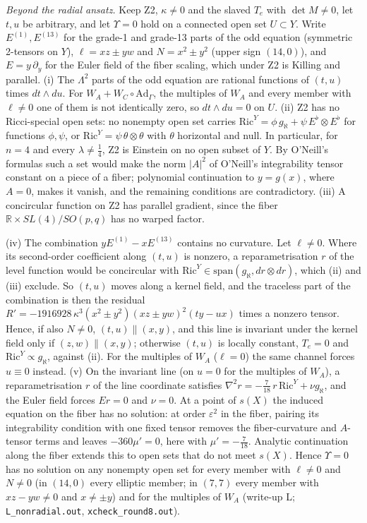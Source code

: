 \documentclass[11pt]{article}
\theoremstyle{remark}
\begin{document}
\emph{Beyond the radial ansatz.} Keep Z2, $\kappa\neq0$ and the slaved $T_e$ with $\det M\neq0$, let $t,u$ be arbitrary, and let $\Upsilon=0$ hold on a connected open set $U\subset Y$. Write $E^{(1)},E^{(13)}$ for the grade-1 and grade-13 parts of the odd equation (symmetric 2-tensors on $Y$), $\ell=xz\pm yw$ and $N=x^2\pm y^2$ (upper sign $(14,0)$), and $E=y\,\partial_y$ for the Euler field of the fiber scaling, which under Z2 is Killing and parallel. (i) The $\Lambda^2$ parts of the odd equation are rational functions of $(t,u)$ times $dt\wedge du$. For $W_A+W_C\circ\mathrm{Ad}_\Gamma$, the multiples of $W_A$ and every member with $\ell\neq0$ one of them is not identically zero, so $dt\wedge du=0$ on $U$. (ii) Z2 has no Ricci-special open sets: no nonempty open set carries $\mathrm{Ric}^Y=\phi\,g_\aleph+\psi\,E^\flat\otimes E^\flat$ for functions $\phi,\psi$, or $\mathrm{Ric}^Y=\psi\,\theta\otimes\theta$ with $\theta$ horizontal and null. In particular, for $n=4$ and every $\lambda\neq\tfrac14$, Z2 is Einstein on no open subset of $Y$. By O'Neill's formulas such a set would make the norm $|A|^2$ of O'Neill's integrability tensor constant on a piece of a fiber; polynomial continuation to $y=g(x)$, where $A=0$, makes it vanish, and the remaining conditions are contradictory. (iii) A concircular function on Z2 has parallel gradient, since the fiber $\mathbb R\times SL(4)/SO(p,q)$ has no warped factor.

(iv) The combination $yE^{(1)}-xE^{(13)}$ contains no curvature. Let $\ell\neq0$. Where its second-order coefficient along $(t,u)$ is nonzero, a reparametrisation $r$ of the level function would be concircular with $\mathrm{Ric}^Y\in\mathrm{span}(g_\aleph,dr\otimes dr)$, which (ii) and (iii) exclude. So $(t,u)$ moves along a kernel field, and the traceless part of the combination is then the residual $R'=-1916928\,\kappa^3(x^2\pm y^2)(xz\pm yw)^2(ty-ux)$ times a nonzero tensor. Hence, if also $N\neq0$, $(t,u)\parallel(x,y)$, and this line is invariant under the kernel field only if $(z,w)\parallel(x,y)$; otherwise $(t,u)$ is locally constant, $T_e=0$ and $\mathrm{Ric}^Y\propto g_\aleph$, against (ii). For the multiples of $W_A$ ($\ell=0$) the same channel forces $u\equiv0$ instead. (v) On the invariant line (on $u=0$ for the multiples of $W_A$), a reparametrisation $r$ of the line coordinate satisfies $\nabla^2r=-\tfrac7{18}\,r\,\mathrm{Ric}^Y+\nu g_\aleph$, and the Euler field forces $Er=0$ and $\nu=0$. At a point of $s(X)$ the induced equation on the fiber has no solution: at order $\varepsilon^2$ in the fiber, pairing its integrability condition with one fixed tensor removes the fiber-curvature and $A$-tensor terms and leaves $-360\mu'=0$, here with $\mu'=-\tfrac7{18}$. Analytic continuation along the fiber extends this to open sets that do not meet $s(X)$. Hence $\Upsilon=0$ has no solution on any nonempty open set for every member with $\ell\neq0$ and $N\neq0$ (in $(14,0)$ every elliptic member; in $(7,7)$ every member with $xz-yw\neq0$ and $x\neq\pm y$) and for the multiples of $W_A$ (write-up L; \texttt{L\_nonradial.out}, \texttt{xcheck\_round8.out}).
\end{document}
